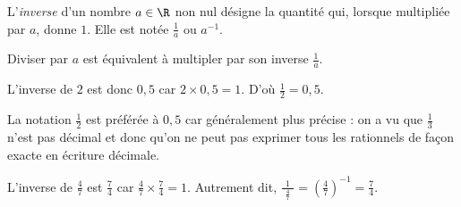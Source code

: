 \begin{dfn}
	L'\emph{inverse} d'un nombre $a \in \R$ non nul désigne la quantité qui, lorsque multipliée par $a$, donne $1$.
	Elle est notée $\frac{1}{a}$ ou $a^{-1}$.
	
	Diviser par $a$ est équivalent à multipler par son inverse $\frac1a$.
\end{dfn}

\begin{remarque}
	L'inverse de $2$ est donc $0,5$ car $2\times0,5 = 1$. 
	D'où $\frac12 = 0,5$.
	
	La notation $\frac12$ est préférée à $0{,}5$ car généralement plus précise : on a vu que $\frac13$ n'est pas décimal et donc qu'on ne peut pas exprimer tous les rationnels de façon exacte en écriture décimale.
\end{remarque}
	
\begin{remarque}
	L'inverse de $\frac47$ est $\frac74$ car $\frac47 \times \frac74 = 1$.
	Autrement dit, $\frac{\ \ 1 \ \ }{\frac47} = \left( \frac47 \right)^{-1} = \frac74$.
\end{remarque}

